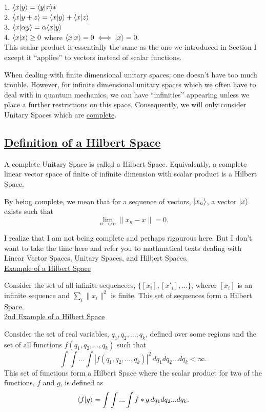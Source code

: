 1. $\langle x|y\rangle = \langle y|x\rangle*$\\
2. $\langle x|y + z\rangle = \langle x|y\rangle + \langle x|z\rangle$\\
3. $\langle x|\alpha y\rangle = \alpha\langle x|y\rangle$\\
4. $\langle x|x\rangle \ge 0$ where $\langle x|x\rangle = 0\iff |x\rangle = 0.$\\

This scalar product is essentially the same as the one we introduced in Section I except it ``applies'' to vectors
instead of scalar functions. 

When dealing with finite dimensional unitary spaces, one doesn't have too much trouble. However, for infinite
dimensional unitary spaces which we often have to deal with in quantum mechanics, we can have ``infinities''
appearing unless we place a further restrictions on this space. Consequently, we will only consider Unitary Spaces
which are \underline{complete}.\\ 

\subsection{\underline{Definition of a Hilbert Space}}
A complete Unitary Space is called a Hilbert Space. Equivalently, a complete
linear vector space of finite of infinite dimension with scalar product is a Hilbert Space.

By being complete, we mean that for a sequence of vectors, $|x_n\rangle$, a vector $|x\rangle$ exists such that
$$\lim_{n\rightarrow \infty} \| x_n - x \| = 0.$$

I realize that I am not being complete and perhaps rigourous here. But I don't want to take the time here 
and refer you to mathmatical texts dealing with Linear Vector Spaces, Unitary Spaces, and Hilbert Spaces.\\

\underline{Example of a Hilbert Space}

Consider the set of all infinite sequencees, $\{[x_i],[x'_i],...\}$, wherer $[x_i]$ is an infinite sequence and 
$\sum_i \|x_i\|^2$ is finite. This set of sequences form a Hilbert Space.\\

\underline{2nd Example of a Hilbert Space}

Consider the set of real variables, $q_1, q_2, ..., q_k$, defined over some regions and the set of all functions
$f(q_1,q_2,...,q_k)$ such that
$$ \int\int...\int |f(q_1,q_2,...,q_k)|^2 \, dq_1 dq_2...dq_k < \infty.$$
This set of functions form a Hilbert Space where the scalar product for two of the functions, $f$ and $g$, is
defined as $$\langle f|g\rangle = \int\int...\int f*g \, dq_1 dq_2...dq_k.$$

